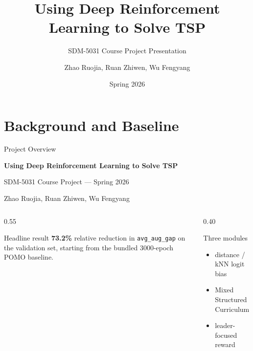 \documentclass[aspectratio=169,11pt]{beamer}
\title{Using Deep Reinforcement Learning to Solve TSP}
\subtitle{SDM-5031 Course Project Presentation}
\author{Zhao Ruojia, Ruan Zhiwen, Wu Fengyang}
\institute{Supervisor: Zhenkun Wang}
\date{Spring 2026}
\begin{document}
\begin{frame}[plain]
  \titlepage
\end{frame}

\section{Background and Baseline}

\begin{frame}[t]{Project Overview}
  \vspace{0.5cm}
  {\color{sdmblue}\LARGE\textbf{Using Deep Reinforcement Learning to Solve TSP}\par}
  \vspace{0.1cm}
  {\large SDM-5031 Course Project --- Spring 2026\par}
  \vspace{0.4cm}
  {Zhao Ruojia, Ruan Zhiwen, Wu Fengyang\par}

  \vspace{1.0cm}
  \begin{columns}[T,totalwidth=\textwidth]
    \begin{column}{0.55\textwidth}
      \begin{block}{Headline result}
        \textbf{73.2\%} relative reduction in \texttt{avg\_aug\_gap}
        on the validation set, starting from the bundled
        3000-epoch POMO baseline.
      \end{block}
    \end{column}
    \begin{column}{0.40\textwidth}
      \begin{alertblock}{Three modules}
        \begin{itemize}
          \item distance / kNN logit bias
          \item Mixed Structured Curriculum
          \item leader-focused reward
        \end{itemize}
      \end{alertblock}
    \end{column}
  \end{columns}
  \vfill
\end{frame}
\end{document}
